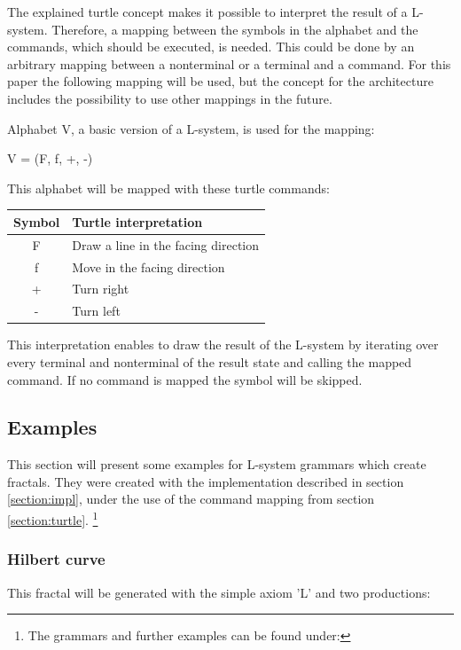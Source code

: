 \documentclass[english]{cpp-hmwk}
\begin{document}
\medskip

\noindent  The explained turtle concept makes it possible to interpret the result of a L-system. Therefore, a mapping between the symbols in the alphabet and the commands, which should be executed, is needed.
This could be done by an arbitrary mapping between a nonterminal or a terminal and a command. For this paper the following mapping will be used, but the concept for the architecture includes the possibility to use other mappings in the future.

\noindent Alphabet V,  a basic version of a L-system, is used for the mapping:

\begin{center}
V = (F, f, +, -)
\end{center}

This alphabet will be mapped with these turtle commands:

\begin{center}
\begin{tabular}{ c l }
Symbol & Turtle interpretation \\
\hline
F & Draw a line in the facing direction  \\ 
f & Move in the facing direction  \\  
+& Turn right  \\  
-& Turn left  \\  

\end{tabular}
\end{center}

\noindent This interpretation enables to draw the result of the L-system by iterating over every terminal and nonterminal of the result state and calling the mapped command. If no command is mapped the symbol will be skipped.

\subsection{Examples}
\label{section:examples}
This section will present some examples for L-system grammars which create fractals. They were created with the implementation described in section \ref{section:impl}, under the use of the command mapping from section \ref{section:turtle}. 
\footnote{The grammars and further examples can be found under: }
  
\subsubsection{Hilbert curve}
This fractal will be generated with the simple axiom 'L' and two productions: 
\end{document}
